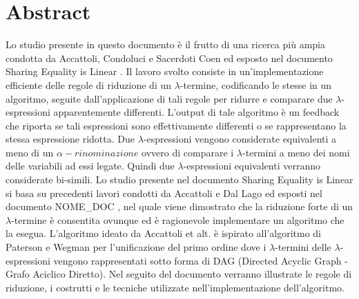\documentclass[12pt,a4paper,openright,twoside]{report}
\begin{document}
\chapter*{Abstract}                 %
Lo studio presente in questo documento \`e il frutto di una ricerca pi\`u ampia condotta da Accattoli, Condoluci e Sacerdoti Coen ed esposto nel documento Sharing Equality is Linear  \cite{K1}.\newline
Il lavoro svolto consiste in un'implementazione efficiente delle regole di riduzione di un $\lambda$-termine, codificando le stesse in un algoritmo, seguite dall'applicazione di tali regole per ridurre e comparare due $\lambda$-espressioni apparentemente differenti. L'output di tale algoritmo \`e un feedback che riporta se tali espressioni sono effettivamente differenti o se rappresentano la stessa espressione ridotta. Due $\lambda$-espressioni vengono considerate equivalenti a meno di un $\alpha-rinominazione$ ovvero di comparare i $\lambda$-termini a meno dei nomi delle variabili ad essi legate. Quindi due $\lambda$-espressioni equivalenti verranno considerate bi-simili.\newline
Lo studio presente nel documento Sharing Equality is Linear  \cite{K1} si basa su precedenti lavori condotti da Accattoli e Dal Lago ed esposti nel documento NOME\_DOC  \cite{K2}, nel quale viene dimostrato che la riduzione forte di un $\lambda$-termine \`e consentita ovunque ed \`e ragionevole implementare un algoritmo che la esegua. \newline
L'algoritmo ideato da Accattoli et alt. \`e ispirato all'algoritmo di Paterson e Wegman \cite{K3} per l'unificazione del primo ordine dove i $\lambda$-termini delle $\lambda$-espressioni vengono rappresentati sotto forma di DAG (Directed Acyclic Graph - Grafo Aciclico Diretto).\newline
Nel seguito del documento verranno illustrate le regole di riduzione, i costrutti e le tecniche utilizzate nell'implementazione dell'algoritmo.\newline
\end{document}
